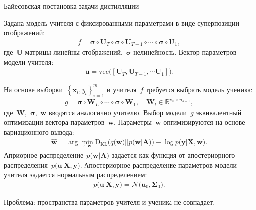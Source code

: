 \documentclass[10pt,pdf,hyperref={unicode}]{beamer}
\begin{document}

\begin{frame}{Байесовская постановка задачи дистилляции}

Задана модель учителя с фиксированными параметрами в виде суперпозиции отображений:
\[
\begin{aligned}
f = \bm{\sigma} \circ \mathbf{U}_T \circ \bm{\sigma} \circ \mathbf{U}_{T-1} \circ \cdots \circ \bm{\sigma} \circ \mathbf{U}_1,
\end{aligned}
\]
где~$\mathbf{U}$ матрицы линейны отображений,~$\bm{\sigma}$ нелинейность. Вектор параметров модели учителя:
\[
\begin{aligned}
\mathbf{u} = \text{vec}\bigr(\left[\mathbf{U}_T, \mathbf{U}_{T-1}, \cdots \mathbf{U}_1\right]\bigr).
\end{aligned}
\]

На основе выборки~$\left\{\mathbf{x}_i, y_i\right\}_{i=1}^{m}$ и учителя~$f$ требуется выбрать модель ученика:
\[
\begin{aligned}
g = \bm{\sigma} \circ \mathbf{W}_L \circ \cdots \circ \bm{\sigma} \circ \mathbf{W}_1, \quad \mathbf{W}_l \in \mathbb{R}^{n_s \times n_{s-1}},
\end{aligned}
\]
где~$\mathbf{W}$,~$\bm{\sigma}$,~$\mathbf{w}$ вводятся аналогично учителю. Выбор модели~$g$ эквивалентный оптимизации вектора параметров~$\mathbf{w}$. Параметры~$\mathbf{w}$ оптимизируются на основе вариационного вывода:
\[
\begin{aligned}
\hat{\mathbf{w}} = \arg \min_{q, \mathbf{w}} \text{D}_{\text{KL}}\bigr(q\bigr(\mathbf{w}\bigr)||p\bigr(\mathbf{w}|\mathbf{A}\bigr)\bigr) - \log p\bigr(\mathbf{y}|\mathbf{X}, \mathbf{w}\bigr).
\end{aligned}
\]
Априорное распределение~$p\bigr(\mathbf{w}|\mathbf{A}\bigr)$ задается как функция от апостериорного распределения~$p\bigr(\mathbf{u}|\mathbf{X}, \mathbf{y}\bigr)$. Апостериорное распределение параметров модели учителя задается нормальным распределением:
\[
\begin{aligned}
p\bigr(\mathbf{u}|\mathbf{X}, \mathbf{y}\bigr) = \mathcal{N}\bigr(\mathbf{u}_0, \bm{\Sigma}_0\bigr).
\end{aligned}
\]

Проблема: пространства параметров учителя и ученика не совпадает.

\end{frame}
\end{document}
